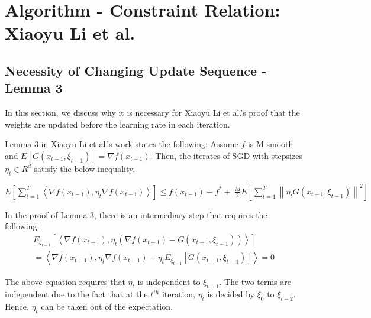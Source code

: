 \documentclass[14pt,onecolumn,letterpaper]{extarticle}
\begin{document}
\section{Algorithm - Constraint Relation: Xiaoyu Li et al.}
\subsection{Necessity of Changing Update Sequence - Lemma 3}
In this section, we discuss why it is necessary for Xiaoyu Li et al.'s proof that the weights are updated before the learning rate in each iteration. \par
Lemma 3 in Xiaoyu Li et al.'s work states the following: Assume $f$ is M-smooth and $E[G(x_{t-1},\xi_{t-1})]=\nabla f(x_{t-1})$. 
Then, the iterates of SGD with stepsizes $\eta_t \in R^{d}$ satisfy the below inequality.
\par\vspace{3mm}
$E\left[\sum_{t=1}^T\left\langle\nabla f\left(x_{t-1}\right), \eta_t \nabla f\left(x_{t-1}\right)\right\rangle\right] \leq f\left(x_{t-1}\right)-f^*  +\ \frac{M}{2} E\left[\sum_{t=1}^T\left\|\eta_t G\left(x_{t-1}, \xi_{t-1}\right)\right\|^2\right]$
\par\vspace{3mm}
In the proof of Lemma 3, there is an intermediary step that requires the following:
\begin{align*}
    E_{\xi_{t-1}}\left[\left\langle\nabla f\left(x_{t-1}\right), \eta_t\left(\nabla f\left(x_{t-1}\right)-G\left(x_{t-1}, \xi_{t-1}\right)\right)\right\rangle\right]\\
    =\left\langle\nabla f\left(x_{t-1}\right), \eta_t \nabla f\left(x_{t-1}\right)-\eta_t E_{\xi_{t-1}}\left[G\left(x_{t-1}, \xi_{t-1}\right)\right]\right\rangle=0
\end{align*}

The above equation requires that $\eta_t$ is independent to $\xi_{t-1}$. The two terms are independent due to the fact that at the $t^{th}$ iteration, $\eta_t$ is decided by $\xi_0$ to $\xi_{t-2}$. Hence, $\eta_t$ can be taken out of the expectation.
\end{document}
